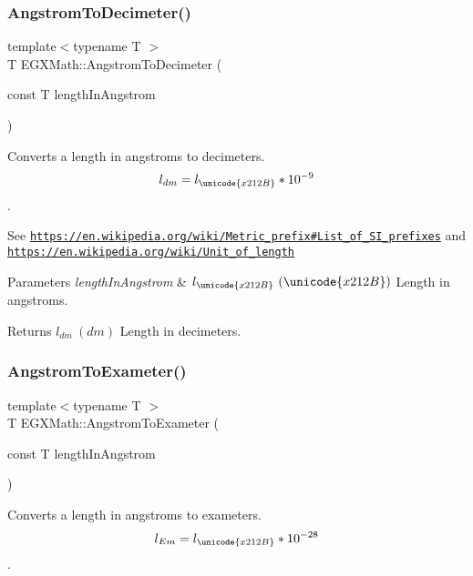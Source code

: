 \subsubsection{\texorpdfstring{Angstrom\+To\+Decimeter()}{AngstromToDecimeter()}}
{\footnotesize\ttfamily template$<$typename T $>$ \\
T E\+G\+X\+Math\+::\+Angstrom\+To\+Decimeter (\begin{DoxyParamCaption}\item[{const T}]{length\+In\+Angstrom }\end{DoxyParamCaption})}



Converts a length in angstroms to decimeters. \[ l_{dm}=l_{\unicode{x212B}} * 10^{-9} \]. 

See \href{https://en.wikipedia.org/wiki/Metric_prefix#List_of_SI_prefixes}{\tt https\+://en.\+wikipedia.\+org/wiki/\+Metric\+\_\+prefix\#\+List\+\_\+of\+\_\+\+S\+I\+\_\+prefixes} and \href{https://en.wikipedia.org/wiki/Unit_of_length}{\tt https\+://en.\+wikipedia.\+org/wiki/\+Unit\+\_\+of\+\_\+length} 
\begin{DoxyParams}{Parameters}
{\em length\+In\+Angstrom} & $ l_{\unicode{x212B}}\ (\unicode{x212B})$ Length in angstroms. \\
\hline
\end{DoxyParams}
\begin{DoxyReturn}{Returns}
$ l_{dm}\ (dm)$ Length in decimeters. 
\end{DoxyReturn}
\mbox{\label{group___e_g_x_math-_conversions-_length_conversions-_non-_s_i-_angstrom-_s_i_gac419ce36b1288ba8547e669af6b5dd75}} 
\subsubsection{\texorpdfstring{Angstrom\+To\+Exameter()}{AngstromToExameter()}}
{\footnotesize\ttfamily template$<$typename T $>$ \\
T E\+G\+X\+Math\+::\+Angstrom\+To\+Exameter (\begin{DoxyParamCaption}\item[{const T}]{length\+In\+Angstrom }\end{DoxyParamCaption})}



Converts a length in angstroms to exameters. \[ l_{Em}=l_{\unicode{x212B}} * 10^{-28} \]. 

